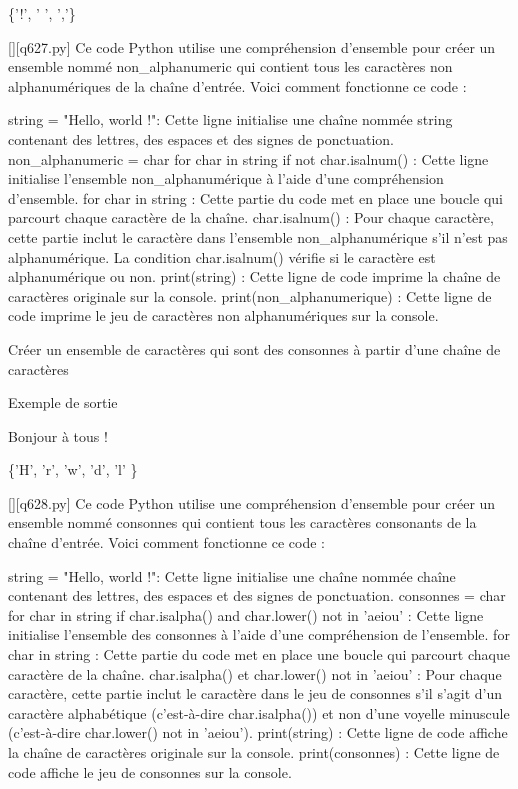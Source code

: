 \{'!', ' ', ','\}
        \par
        \begin{solution}
            \renewcommand{\nomfichier}{q627.py}
            \pythonfile{\chemincode \nomfichier}[][\nomfichier]
            Ce code Python utilise une compréhension d'ensemble pour créer un ensemble nommé non_alphanumeric qui contient tous les caractères non alphanumériques de la chaîne d'entrée. Voici comment fonctionne ce code :

    string = "Hello, world !": Cette ligne initialise une chaîne nommée string contenant des lettres, des espaces et des signes de ponctuation.
    non_alphanumeric = {char for char in string if not char.isalnum()} : Cette ligne initialise l'ensemble non_alphanumérique à l'aide d'une compréhension d'ensemble.
        for char in string : Cette partie du code met en place une boucle qui parcourt chaque caractère de la chaîne.
        {char.isalnum()} : Pour chaque caractère, cette partie inclut le caractère dans l'ensemble non_alphanumérique s'il n'est pas alphanumérique. La condition char.isalnum() vérifie si le caractère est alphanumérique ou non.
    print(string) : Cette ligne de code imprime la chaîne de caractères originale sur la console.
    print(non_alphanumerique) : Cette ligne de code imprime le jeu de caractères non alphanumériques sur la console.
        \end{solution}
        

        \question
        Créer un ensemble de caractères qui sont des consonnes à partir d'une chaîne de caractères

Exemple de sortie

Bonjour à tous !

\{'H', 'r', 'w', 'd', 'l' \}
        \par
        \begin{solution}
            \renewcommand{\nomfichier}{q628.py}
            \pythonfile{\chemincode \nomfichier}[][\nomfichier]
            Ce code Python utilise une compréhension d'ensemble pour créer un ensemble nommé consonnes qui contient tous les caractères consonants de la chaîne d'entrée. Voici comment fonctionne ce code :

    string = "Hello, world !": Cette ligne initialise une chaîne nommée chaîne contenant des lettres, des espaces et des signes de ponctuation.
    consonnes = {char for char in string if char.isalpha() and char.lower() not in 'aeiou'} : Cette ligne initialise l'ensemble des consonnes à l'aide d'une compréhension de l'ensemble.
        for char in string : Cette partie du code met en place une boucle qui parcourt chaque caractère de la chaîne.
        {char.isalpha() et char.lower() not in 'aeiou'} : Pour chaque caractère, cette partie inclut le caractère dans le jeu de consonnes s'il s'agit d'un caractère alphabétique (c'est-à-dire char.isalpha()) et non d'une voyelle minuscule (c'est-à-dire char.lower() not in 'aeiou').
    print(string) : Cette ligne de code affiche la chaîne de caractères originale sur la console.
    print(consonnes) : Cette ligne de code affiche le jeu de consonnes sur la console.
        \end{solution}
        

